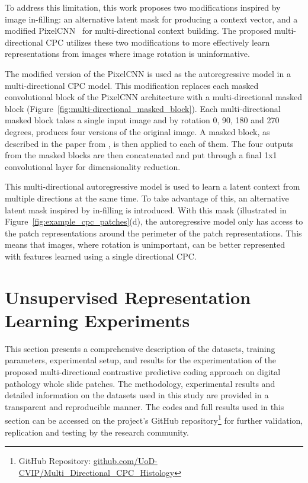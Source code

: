 To address this limitation, this work proposes two modifications inspired by image in-filling: an alternative latent mask for producing a context vector, and a modified PixelCNN~\citep{oord2016pixel} for multi-directional context building. The proposed multi-directional CPC utilizes these two modifications to more effectively learn representations from images where image rotation is uninformative.

The modified version of the PixelCNN is used as the autoregressive model in a multi-directional CPC model. This modification replaces each masked convolutional block of the PixelCNN architecture with a multi-directional masked block (Figure~\ref{fig:multi-directional_masked_block}). Each multi-directional masked block takes a single input image and by rotation 0, 90, 180 and 270 degrees, produces four versions of the original image. A masked block, as described in the paper from \cite{oord2016pixel}, is then applied to each of them. The four outputs from the masked blocks are then concatenated and put through a final 1x1 convolutional layer for dimensionality reduction.

This multi-directional autoregressive model is used to learn a latent context from multiple directions at the same time. To take advantage of this, an alternative latent mask inspired by in-filling is introduced. With this mask (illustrated in Figure~\ref{fig:example_cpc_patches}(d), the autoregressive model only has access to the patch representations around the perimeter of the patch representations. This means that images, where rotation is unimportant, can be better represented with features learned using a single directional CPC.



\section{Unsupervised Representation Learning Experiments}
\label{sec:unsupervised_experiments}
This section presents a comprehensive description of the datasets, training parameters, experimental setup, and results for the experimentation of the proposed multi-directional contrastive predictive coding approach on digital pathology whole slide patches. The methodology, experimental results and detailed information on the datasets used in this study are provided in a transparent and reproducible manner. The codes and full results used in this section can be accessed on the project's GitHub repository\footnote{GitHub Repository: \url{github.com/UoD-CVIP/Multi_Directional_CPC_Histology}} for further validation, replication and testing by the research community.

